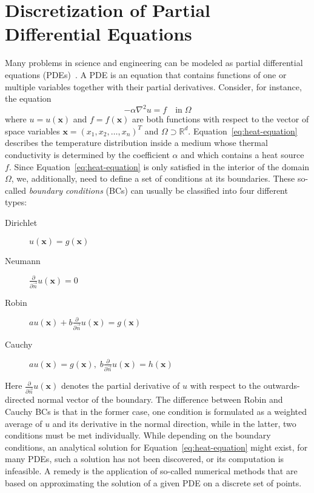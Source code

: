 \section{Discretization of Partial Differential Equations}\label{sec:discretization}
Many problems in science and engineering can be modeled as partial differential equations (PDEs)~\cite{folland2020introduction,evans2010partial}.
A PDE is an equation that contains functions of one or multiple variables together with their partial derivatives.
Consider, for instance, the equation
\begin{equation}
	-\alpha \nabla^2 u = f \quad \text{in} \; \Omega 
	\label{eq:heat-equation}
\end{equation}
where $u = u(\bm{x})$ and $f = f(\bm{x})$ are both functions with respect to the vector of space variables $\bm{x} = (x_1, x_2, \dots, x_n)^T$ and $\Omega \supset \mathbb{R}^d$.
Equation~\eqref{eq:heat-equation} describes the temperature distribution inside a medium whose thermal conductivity is determined by the coefficient $\alpha$ and which contains a heat source $f$.
Since Equation~\eqref{eq:heat-equation} is only satisfied in the interior of the domain $\Omega$, we, additionally, need to define a set of conditions at its boundaries.
These so-called \emph{boundary conditions} (BCs) can usually be classified into four different types:
\begin{description}
	\item[Dirichlet] $u(\bm{x}) = g(\bm{x})$
	\item[Neumann] $\frac{\partial}{\partial \vec{n}} u(\bm{x}) = 0$
	\item[Robin] $a u(\bm{x}) + b \frac{\partial}{\partial \vec{n}} u(\bm{x}) = g(\bm{x})$
	\item[Cauchy] $a u(\bm{x}) = g(\bm{x}), \; b \frac{\partial}{\partial \vec{n}} u(\bm{x}) = h(\bm{x})$
\end{description}
Here $\frac{\partial}{\partial \vec{n}} u(\bm{x})$ denotes the partial derivative of $u$ with respect to the outwards-directed normal vector of the boundary.
The difference between Robin and Cauchy BCs is that in the former case, one condition is formulated as a weighted average of $u$ and its derivative in the normal direction, while in the latter, two conditions must be met individually.
While depending on the boundary conditions, an analytical solution for Equation~\eqref{eq:heat-equation} might exist, for many PDEs, such a solution has not been discovered, or its computation is infeasible.
A remedy is the application of so-called numerical methods that are based on approximating the solution of a given PDE on a discrete set of points. 
